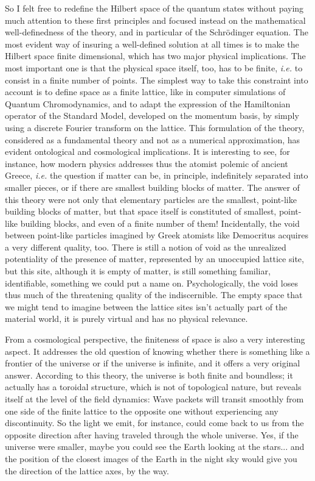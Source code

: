 So I felt free to redefine the Hilbert space of the quantum states without paying much attention to these first principles and focused instead on the mathematical well-definedness of the theory, and in particular of the Schrödinger equation. The most evident way of insuring a well-defined solution at all times is to make the Hilbert space finite dimensional, which has two major physical implications. The most important one is that the physical space itself, too, has to be finite, \textit{i.e.} to consist in a finite number of points. The simplest way to take this constraint into account is to define space as a finite lattice, like in computer simulations of Quantum Chromodynamics, and to adapt the expression of the Hamiltonian operator of the Standard Model, developed on the momentum basis, by simply using a discrete Fourier transform on the lattice. This formulation of the theory, considered as a fundamental theory and not as a numerical approximation, has evident ontological and cosmological implications. It is interesting to see, for instance, how modern physics addresses thus the atomist polemic of ancient Greece, \textit{i.e.} the question if matter can be, in principle, indefinitely separated into smaller pieces, or if there are smallest building blocks of matter. The answer of this theory were not only that elementary particles are the smallest, point-like building blocks of matter, but that space itself is constituted of smallest, point-like building blocks, and even of a finite number of them! Incidentally, the void between point-like particles imagined by Greek atomists like Democritus acquires a very different quality, too. There is still a notion of void as the unrealized potentiality of the presence of matter, represented by an unoccupied lattice site, but this site, although it is empty of matter, is still something familiar, identifiable, something we could put a name on. Psychologically, the void loses thus much of the threatening quality of the indiscernible. The empty space that we might tend to imagine between the lattice sites isn't actually part of the material world, it is purely virtual and has no physical relevance.

From a cosmological perspective, the finiteness of space is also a very interesting aspect. It addresses the old question of knowing whether there is something like a frontier of the universe or if the universe is infinite, and it offers a very original answer. According to this theory, the universe is both finite and boundless; it actually has a toroidal structure, which is not of topological nature, but reveals itself at the level of the field dynamics: Wave packets will transit smoothly from one side of the finite lattice to the opposite one without experiencing any discontinuity. So the light we emit, for instance, could come back to us from the opposite direction after having traveled through the whole universe. Yes, if the universe were smaller, maybe you could see the Earth looking at the stars... and the position of the closest images of the Earth in the night sky would give you the direction of the lattice axes, by the way.

